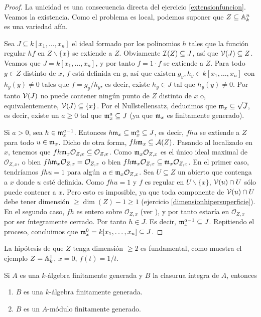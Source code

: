 \documentclass[ACGA.tex]{subfiles}
\begin{document}
\begin{proof}
 La unicidad es una consecuencia directa del ejercicio \ref{extensionfuncion}. Veamos la existencia. Como el problema es local, podemos suponer que $Z\subseteq\mathbb{A}^n_k$ es una variedad afín.

 Sea $J\subseteq k[x_1,\ldots,x_n]$ el ideal formado por los polinomios $h$ tales que la función regular $hf$ en $Z\backslash\{x\}$ se extiende a $Z$. Obviamente $\mathcal{I}(Z)\subseteq J$, así que $\mathcal{V}(J)\subseteq Z$. Veamos que $J=k[x_1,\ldots,x_n]$, y por tanto $f=1\cdot f$ se extiende a $Z$. Para todo $y\in Z$ distinto de $x$, $f$ está definida en $y$, así que existen $g_y,h_y\in k[x_1,\ldots,x_n]$ con $h_y(y)\neq 0$ tales que $f=g_y/h_y$, es decir, existe $h_y\in J$ tal que $h_y(y)\neq 0$. Por tanto $\mathcal{V}(J)$ no puede contener ningún punto de $Z$ distinto de $x$ o, equivalentemente, $\mathcal{V}(J)\subseteq\{x\}$. Por el Nullstellensatz, deducimos que ${\mathfrak{m}}_x\subseteq\sqrt{J}$, es decir, existe un $a\geq 0$ tal que ${\mathfrak{m}}_x^a\subseteq J$ (ya que ${\mathfrak{m}}_x$ es finitamente generado).

Si $a>0$, sea $h\in{\mathfrak{m}}_x^{a-1}$. Entonces $h{\mathfrak{m}}_x\subseteq{\mathfrak{m}}_x^a\subseteq J$, es decir, $fhu$ se extiende a $Z$ para todo $u\in{\mathfrak{m}}_x$. Dicho de otra forma, $fh{\mathfrak{m}}_x\subseteq\mathcal{A}(Z)$. Pasando al localizado en $x$, tenemos que $fh{\mathfrak{m}}_x{\mathcal O}_{Z,x}\subseteq{\mathcal O}_{Z,x}$. Como ${\mathfrak{m}}_x{\mathcal O}_{Z,x}$ es el único ideal maximal de ${\mathcal O}_{Z,x}$, o bien $fh{\mathfrak{m}}_x{\mathcal O}_{Z,x}={\mathcal O}_{Z,x}$ o bien $fh{\mathfrak{m}}_x{\mathcal O}_{Z,x}\subseteq{\mathfrak{m}}_x{\mathcal O}_{Z,x}$. En el primer caso, tendríamos $fhu=1$ para algún $u\in{\mathfrak{m}}_x{\mathcal O}_{Z,x}$. Sea $U\subseteq Z$ un abierto que contenga a $x$ donde $u$ esté definida. Como $fhu=1$ y $f$ es regular en $U\backslash\{x\}$, $\mathcal{V}(u)\cap U$ sólo puede contener a $x$. Pero esto es imposible, ya que toda componente de $\mathcal{V}(u)\cap U$ debe tener dimensión $\geq\dim(Z)-1\geq 1$ (ejercicio \ref{dimensionhipersuperficie}). En el segundo caso, $fh$ es entero sobre ${\mathcal O}_{Z,x}$ (ver \cite[Proposición 2.4]{am}), y por tanto estaría en ${\mathcal O}_{Z,x}$ por ser íntegramente cerrado. Por tanto $h\in J$. Es decir, ${\mathfrak{m}}_x^{a-1}\subseteq J$. Repitiendo el proceso, concluimos que ${\mathfrak{m}}_x^0=k[x_1,\ldots,x_n]\subseteq J$.
\end{proof}

La hipótesis de que $Z$ tenga dimensión $\geq 2$ es fundamental, como muestra el ejemplo $Z=\mathbb{A}^1_k$, $x=0$, $f(t)=1/t$.

\begin{teorema}
Si $A$ es una $k$-álgebra finitamente generada y $B$ la clasurua íntegra de $A$, entonces
\begin{enumerate}
\item $B$ es una $k$-álgebra finitamente generada.
\item $B$ es un $A$-módulo finitamente generado.
\end{enumerate}
\end{teorema}
\end{document}
